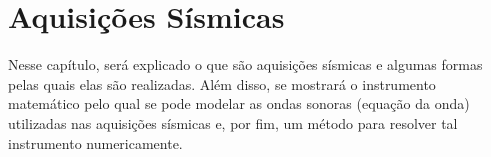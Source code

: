 \chapter{Aquisições Sísmicas}

\label{chp2}

Nesse capítulo, será explicado o que são aquisições sísmicas e
algumas formas pelas quais elas são realizadas. Além disso, se
mostrará o instrumento matemático pelo qual se pode modelar as
ondas sonoras (equação da onda) utilizadas nas aquisições
sísmicas e, por fim, um método para resolver tal instrumento
numericamente.






